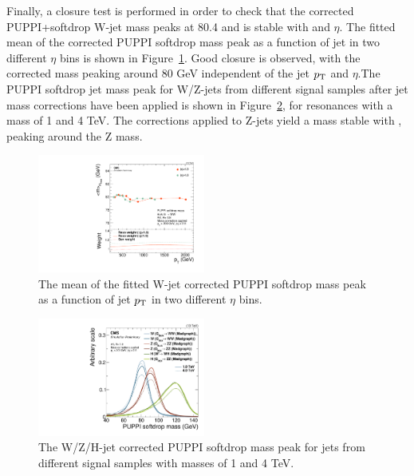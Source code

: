   
Finally, a closure test is performed in order to check that the corrected PUPPI+softdrop W-jet mass peaks at 80.4 \GeV and is stable with \PT and $\eta$. The fitted mean of the corrected PUPPI softdrop mass peak as a function of jet \PT in two different $\eta$ bins is shown in Figure~\ref{fig:searchII:wtagclosure}. Good closure is observed, with the corrected mass peaking around 80 GeV independent of the jet $p_{\mathrm{T}}$ and $\eta$.The PUPPI softdrop jet mass peak for W/Z-jets from different signal samples after jet mass corrections have been applied is shown in Figure~\ref{fig:search2:corrMass}, for resonances with a mass of 1 and 4 TeV. The corrections applied to Z-jets yield a mass stable with \PT, peaking around the Z mass. 
\begin{figure}[htbp]
\centering
\includegraphics[width=0.49\textwidth]{figures/analysis/search2/AN-16-235/plots/ClosureTest_RecoMass.pdf}
\caption{The mean of the fitted W-jet corrected PUPPI softdrop mass peak as a function of jet $p_{\mathrm{T}}$ in two different $\eta$ bins.}
\label{fig:searchII:wtagclosure}
\end{figure}

\begin{figure}[htbp]
\centering
\includegraphics[width=0.49\textwidth]{figures/analysis/search2/AN-16-235/plots/SoftdropMass_NEWCORR_wH0.pdf}
\caption{The W/Z/H-jet corrected PUPPI softdrop mass peak for jets from different signal samples with masses of 1 and 4 TeV.}
\label{fig:search2:corrMass}
\end{figure}

